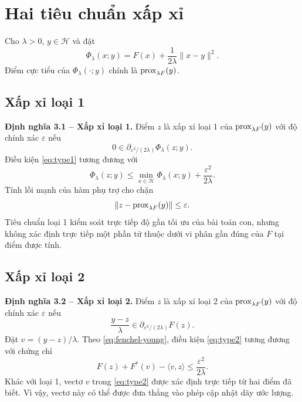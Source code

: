 \section{Hai tiêu chuẩn xấp xỉ}

Cho $\lambda>0$, $y\in\mathcal{H}$ và đặt
\[
\Phi_{\lambda}(x;y)
=F(x)+\frac{1}{2\lambda}\|x-y\|^2.
\]
Điểm cực tiểu của $\Phi_{\lambda}(\cdot;y)$ chính là $\operatorname{prox}_{\lambda F}(y)$.

\subsection{Xấp xỉ loại 1}

\noindent\textbf{Định nghĩa 3.1 -- Xấp xỉ loại 1.}
Điểm $z$ là xấp xỉ loại 1 của $\operatorname{prox}_{\lambda F}(y)$ với độ chính xác $\varepsilon$ nếu
\begin{equation}
0\in\partial_{\varepsilon^2/(2\lambda)}\Phi_{\lambda}(z;y).
\label{eq:type1}
\end{equation}
Điều kiện \eqref{eq:type1} tương đương với
\begin{equation}
\Phi_{\lambda}(z;y)
\leq
\min_{x\in\mathcal{H}}\Phi_{\lambda}(x;y)
+\frac{\varepsilon^2}{2\lambda}.
\label{eq:type1-gap}
\end{equation}
Tính lồi mạnh của hàm phụ trợ cho chặn
\[
\|z-\operatorname{prox}_{\lambda F}(y)\|\leq\varepsilon.
\]
Tiêu chuẩn loại 1 kiểm soát trực tiếp độ gần tối ưu của bài toán con, nhưng không xác định trực tiếp một phần tử thuộc dưới vi phân gần đúng của $F$ tại điểm được tính.

\subsection{Xấp xỉ loại 2}

\noindent\textbf{Định nghĩa 3.2 -- Xấp xỉ loại 2.}
Điểm $z$ là xấp xỉ loại 2 của $\operatorname{prox}_{\lambda F}(y)$ với độ chính xác $\varepsilon$ nếu
\begin{equation}
\frac{y-z}{\lambda}
\in\partial_{\varepsilon^2/(2\lambda)}F(z).
\label{eq:type2}
\end{equation}
Đặt $v=(y-z)/\lambda$. Theo \eqref{eq:fenchel-young}, điều kiện \eqref{eq:type2} tương đương với chứng chỉ
\begin{equation}
F(z)+F^{*}(v)-\langle v,z\rangle
\leq\frac{\varepsilon^2}{2\lambda}.
\label{eq:type2-cert}
\end{equation}
Khác với loại 1, vectơ $v$ trong \eqref{eq:type2} được xác định trực tiếp từ hai điểm đã biết. Vì vậy, vectơ này có thể được đưa thẳng vào phép cập nhật dãy ước lượng.

